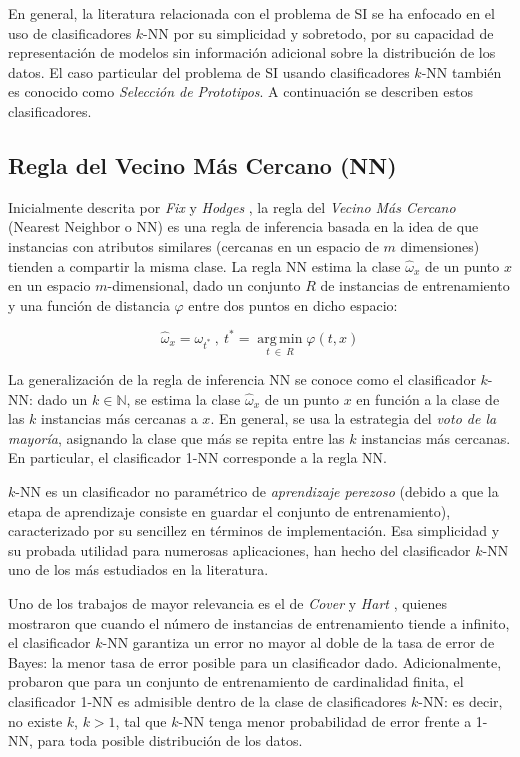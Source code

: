 En general, la literatura relacionada con el problema de SI se ha enfocado en el uso de clasificadores $k$-NN \cite{Garcia:2012:PSN:2122272.2122582} por su simplicidad y sobretodo, por su capacidad de representación de modelos sin información adicional sobre la distribución de los datos. El caso particular del problema de SI usando clasificadores $k$-NN también es conocido como \emph{Selección de Prototipos}. A continuación se describen estos clasificadores.

\subsection{Regla del Vecino Más Cercano (NN)}

Inicialmente descrita por \emph{Fix} y \emph{Hodges} \cite{fix_51_discriminatory}, la regla del \emph{Vecino Más Cercano} (Nearest Neighbor o NN) es una regla de inferencia basada en la idea de que instancias con atributos similares (cercanas en un espacio de $m$ dimensiones) tienden a compartir la misma clase. La regla NN estima la clase $\hat{\omega}_x$ de un punto $x$ en un espacio $m$-dimensional, dado un conjunto $R$ de instancias de entrenamiento y una función de distancia $\varphi$ entre dos puntos en dicho espacio:

\begin{equation}
\hat{\omega}_x = \omega_{t^*}\ ,\ 
t^* = \operatorname*{arg\,min}_{t\ \in\ R} \varphi(t,x)
\end{equation}

La generalización de la regla de inferencia NN se conoce como el clasificador $k$-NN: dado un $k \in \mathbb{N}$, se estima la clase $\hat{\omega}_x$ de un punto $x$ en función a la clase de las $k$ instancias más cercanas a $x$. En general, se usa la estrategia del \guillemotleft\emph{voto de la mayoría}\guillemotright, asignando la clase que más se repita entre las $k$ instancias más cercanas. En particular, el clasificador 1-NN corresponde a la regla NN.

$k$-NN es un clasificador no paramétrico de \emph{aprendizaje perezoso} (debido a que la etapa de aprendizaje consiste en guardar el conjunto de entrenamiento), caracterizado por su sencillez en términos de implementación. Esa simplicidad y su probada utilidad para numerosas aplicaciones, han hecho del clasificador $k$-NN uno de los más estudiados en la literatura.

Uno de los trabajos de mayor relevancia es el de \emph{Cover} y \emph{Hart} \cite{Cover:2006:NNP:2263261.2267456}, quienes mostraron que cuando el número de instancias de entrenamiento tiende a infinito, el clasificador $k$-NN garantiza un error no mayor al doble de la tasa de error de Bayes: la menor tasa de error posible para un clasificador dado. Adicionalmente, probaron que para un conjunto de entrenamiento de cardinalidad finita, el clasificador 1-NN es admisible dentro de la clase de clasificadores $k$-NN: es decir, no existe $k$, $k > 1$, tal que $k$-NN tenga menor probabilidad de error frente a 1-NN, para toda posible distribución de los datos.

